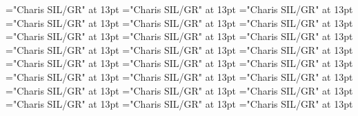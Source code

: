 \documentclass[a4paper]{article}
\begin{document}
\font\spanenCmPossibilitypublishStemTransTypeNamePubenCmTranslationpublishStemTypeConfigtranslationsexamplessensesensesentryletDatadicBody="Charis SIL/GR" at 13pt
\font\spanenCmTranslationpublishStemTypeConfigtranslationsexamplessensesensesentryletDatadicBody="Charis SIL/GR" at 13pt
\font\translationLdtetranslationsexamplessensesensesentryletDatadicBody="Charis SIL/GR" at 13pt
\font\spantetranslationLdtetranslationsexamplessensesensesentryletDatadicBody="Charis SIL/GR" at 13pt
\font\spanentranslationLdtetranslationsexamplessensesensesentryletDatadicBody="Charis SIL/GR" at 13pt
\font\spanenexamplessensesensesentryletDatadicBody="Charis SIL/GR" at 13pt
\font\semanticdomainssensesensesentryletDatadicBody="Charis SIL/GR" at 13pt
\font\spanensemanticdomainssensesensesentryletDatadicBody="Charis SIL/GR" at 13pt
\font\semanticdomainabbrensemanticdomainssensesensesentryletDatadicBody="Charis SIL/GR" at 13pt
\font\spanensemanticdomainabbrensemanticdomainssensesensesentryletDatadicBody="Charis SIL/GR" at 13pt
\font\semanticdomainnameensemanticdomainssensesensesentryletDatadicBody="Charis SIL/GR" at 13pt
\font\spanensemanticdomainnameensemanticdomainssensesensesentryletDatadicBody="Charis SIL/GR" at 13pt
\font\spanensensesentryletDatadicBody="Charis SIL/GR" at 13pt
\font{}="Charis SIL/GR" at 13pt
\font\xitemendefinitionLdensensesensesentryletDatadicBody="Charis SIL/GR" at 13pt
\font\spanenxitemendefinitionLdensensesensesentryletDatadicBody="Charis SIL/GR" at 13pt
\font\spanendefinitionLdensensesensesentryletDatadicBody="Charis SIL/GR" at 13pt
\font\xitemtedefinitionLdensensesensesentryletDatadicBody="Charis SIL/GR" at 13pt
\font\spantexitemtedefinitionLdensensesensesentryletDatadicBody="Charis SIL/GR" at 13pt
\font\LexSensepublishStemGlossPubLdensensesensesentryletDatadicBody="Charis SIL/GR" at 13pt
\font\xitemenLexSensepublishStemGlossPubLdensensesensesentryletDatadicBody="Charis SIL/GR" at 13pt
\font\spanenxitemenLexSensepublishStemGlossPubLdensensesensesentryletDatadicBody="Charis SIL/GR" at 13pt
\font\xitemteLexSensepublishStemGlossPubLdensensesensesentryletDatadicBody="Charis SIL/GR" at 13pt
\font\spantexitemteLexSensepublishStemGlossPubLdensensesensesentryletDatadicBody="Charis SIL/GR" at 13pt
\end{document}
